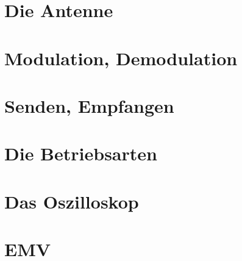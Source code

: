 \documentclass[ngerman,openany, twoside]{Script}
\begin{document}
\newpage \vspace*{5cm}
\newpage

\chapter{Die Antenne}


\newpage \vspace*{5cm}
\newpage

\chapter{Modulation, Demodulation}


\newpage \vspace*{5cm}
\newpage

\chapter{Senden, Empfangen}


\newpage \vspace*{5cm}
\newpage

\chapter{Die Betriebsarten}


\chapter{Das Oszilloskop}


\chapter{EMV}



\end{document}
